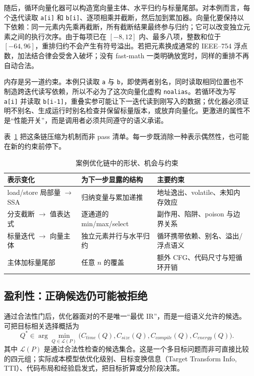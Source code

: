 随后，循环向量化器可以构造宽向量主体、水平归约与标量尾部。对本例而言，每个迭代读取 \texttt{a[i]} 和 \texttt{b[i]}、逐项相乘并截断，然后加到累加器。向量化要保持以下依赖：同一元素内先乘再截断，所有截断结果最终参与归约；它可以改变独立元素之间的执行次序。由于每项已在 \([-8,12]\) 内、最多八项，整数和位于 \([-64,96]\)，重排归约不会产生有符号溢出。若把元素换成通常的 IEEE--754 浮点数，加法结合律会受舍入破坏；没有 fast-math 一类明确放宽时，同样的重排不再自动合法。

内存是另一道约束。本例只读取 \texttt{a} 与 \texttt{b}，即使两者别名，同时读取相同位置也不制造跨迭代读写依赖，所以不必为了这次向量化虚构 \texttt{noalias}。若循环改为写 \texttt{a[i]} 并读取 \texttt{b[i-1]}，重叠实参可能让下一迭代读到刚写入的数据；优化器必须证明不别名、生成运行时别名检查并保留标量版本，或放弃向量化\cite{llvm-aa,llvm-vectorizers}。更激进的属性不是“性能开关”，而是调用者必须共同遵守的语义承诺。

表~\ref{tab:optimization-chain} 把这条链压缩为机制而非 pass 清单。每一步既消除一种表示偶然性，也可能在新的约束前停下。

\begin{table}[t]
  \centering
  \caption{案例优化链中的形状、机会与约束}
  \label{tab:optimization-chain}
  \scriptsize
  \begin{tabular}{p{}p{}p{}}
    \toprule
    表示变化 & 为下一步显露的结构 & 主要约束 \\
    \midrule
    load/store 局部量 $\to$ SSA & 归纳变量与累加递推 & 地址逸出、volatile、未知内存效应 \\
    分支截断 $\to$ 值表达式 & 逐通道的 min/max/select & 副作用、陷阱、poison 与边界关系 \\
    标量迭代 $\to$ 向量主体 & 独立元素并行与水平归约 & 循环携带依赖、别名、溢出/浮点语义 \\
    主体加标量尾部 & 任意 \(n\) 的覆盖 & 额外 CFG、代码尺寸与短循环开销 \\
    \bottomrule
  \end{tabular}
\end{table}

\subsection{盈利性：正确候选仍可能被拒绝}

通过合法性门后，优化器面对的不是唯一“最优 IR”，而是一组语义允许的候选。可把目标相关选择概括为
\[
 Q^*\in\arg\min_{Q\in\mathcal{L}(P)}
 \bigl(C_{time}(Q),C_{size}(Q),C_{compile}(Q),C_{energy}(Q)\bigr).
\]
其中 \(\mathcal{L}(P)\) 是通过合法性检查的候选集合。这是一个多目标问题而非可直接比较的四元组；实际成本模型依优化级别、目标变换信息（Target Transform Info, TTI）、代码布局和经验启发式，把目标折算或分阶段决策。

